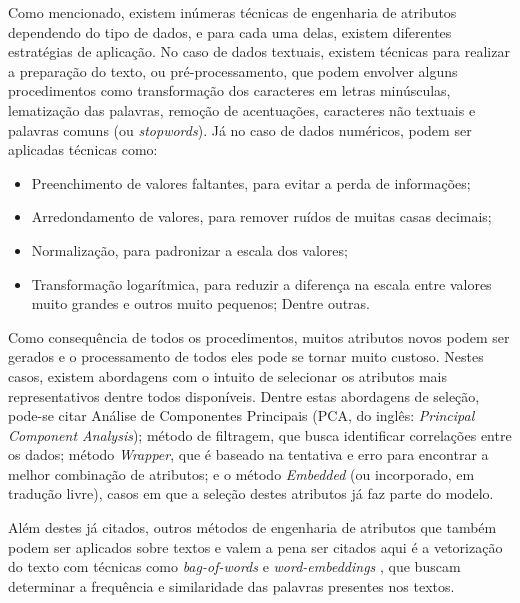 \documentclass[oneside,openright,12pt]{ufsm_2015} %
\begin{document}
    \par Como mencionado, existem inúmeras técnicas de engenharia de atributos dependendo do tipo de dados, e para cada uma delas, existem diferentes estratégias de aplicação. No caso de dados textuais, existem técnicas para realizar a preparação do texto, ou pré-processamento, que podem envolver alguns procedimentos como transformação dos caracteres em letras minúsculas, lematização das palavras, remoção de acentuações, caracteres não textuais e palavras comuns (ou \textit{stopwords}). Já no caso de dados numéricos, podem ser aplicadas técnicas como:
    
    \begin{itemize}
        \item Preenchimento de valores faltantes, para evitar a perda de informações;
        \item Arredondamento de valores, para remover ruídos de muitas casas decimais;
        \item Normalização, para padronizar a escala dos valores;
        \item Transformação logarítmica, para reduzir a diferença na escala entre valores muito grandes e outros muito pequenos; Dentre outras.
    \end{itemize}
    
    \par Como consequência de todos os procedimentos, muitos atributos novos podem ser gerados e o processamento de todos eles pode se tornar muito custoso. Nestes casos, existem abordagens com o intuito de selecionar os atributos mais representativos dentre todos disponíveis. Dentre estas abordagens de seleção, pode-se citar Análise de Componentes Principais (PCA, do inglês: \textit{Principal Component Analysis}); método de filtragem, que busca identificar correlações entre os dados; método \textit{Wrapper}, que é baseado na tentativa e erro para encontrar a melhor combinação de atributos; e o método \textit{Embedded} (ou incorporado, em tradução livre), casos em que a seleção destes atributos já faz parte do modelo.
    
    \par Além destes já citados, outros métodos de engenharia de atributos que também podem ser aplicados sobre textos e valem a pena ser citados aqui é a vetorização do texto com técnicas como \textit{bag-of-words} \cite{mikolov:2013:2} e \textit{word-embeddings} \cite{mikolov:2013:1}, que buscam determinar a frequência e similaridade das palavras presentes nos textos.
\end{document}
